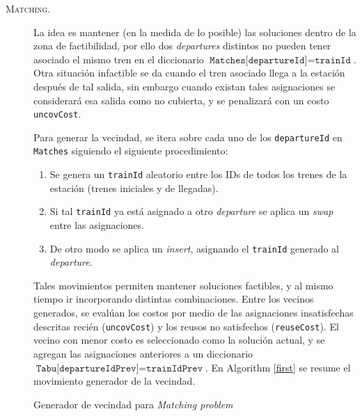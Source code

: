 \documentclass[letter, 10pt]{article}
\begin{document}
\begin{description}
    \item[\textsc{Matching.}] La idea es mantener (en la medida de lo posible) las soluciones dentro de la zona de factibilidad, por ello dos \textit{departures} distintos no pueden tener asociado el mismo tren en el diccionario $\texttt{Matches[departureId]}=\texttt{trainId}$. Otra situación infactible se da cuando el tren asociado llega a la estación después de tal salida, sin embargo cuando existan tales asignaciones se considerará esa salida como no cubierta, y se penalizará con un costo \texttt{uncovCost}.

    Para generar la vecindad, se itera sobre cada uno de los \texttt{departureId} en \texttt{Matches} siguiendo el siguiente procedimiento:
    \begin{enumerate}
        \item Se genera un \texttt{trainId} aleatorio entre los IDs de todos los trenes de la estación (trenes iniciales y de llegadas).
        \item Si tal \texttt{trainId} ya está asignado a otro \textit{departure} se aplica un \textit{swap} entre las asignaciones.
        \item De otro modo se aplica un \textit{insert}, asignando el \texttt{trainId} generado al \textit{departure}.
    \end{enumerate}
    Tales movimientos permiten mantener soluciones factibles, y al mismo tiempo ir incorporando distintas combinaciones. Entre los vecinos generados, se evalúan los costos por medio de las asignaciones insatisfechas descritas recién (\texttt{uncovCost}) y los reusos no satisfechos (\texttt{reuseCost}). El vecino con menor costo es seleccionado como la solución actual, y se agregan las asignaciones anteriores a un diccionario $\texttt{Tabu[departureIdPrev]}=\texttt{trainIdPrev}$. En Algorithm \ref{first} se resume el movimiento generador de la vecindad.

\begin{algorithm}
\caption{Generador de vecindad para \textit{Matching problem}}\label{first}
\begin{algorithmic}[1]
\Else
{}
\EndIf
{}
\EndIf
{}
\EndFor
\EndProcedure
\end{algorithmic}
\end{algorithm}



\end{description}
\end{document}
